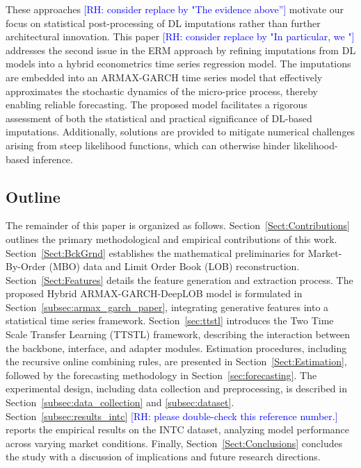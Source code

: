 \documentclass[10pt,a4paper,oneside]{article}
\newcommand{\rh}[1]{\textcolor{blue}{\textsf{[RH: #1]}}}
\begin{document}
These approaches \rh{consider replace by "The evidence above''} motivate our focus on statistical post-processing of DL imputations rather than further architectural innovation. This paper \rh{consider replace by "In particular, we "} addresses the second issue in the ERM approach by refining imputations from DL models into a hybrid econometrics time series regression model. The imputations are embedded into an ARMAX-GARCH time series model that effectively approximates the stochastic dynamics of the micro-price process, thereby enabling reliable forecasting. The proposed model facilitates a rigorous assessment of both the statistical and practical significance of DL-based imputations. Additionally, solutions are provided to mitigate numerical challenges arising from steep likelihood functions, which can otherwise hinder likelihood-based inference.

\subsection{Outline}
\label{subsec:outline}

The remainder of this paper is organized as follows. Section~\ref{Sect:Contributions} outlines the primary methodological and empirical contributions of this work. Section~\ref{Sect:BckGrnd} establishes the mathematical preliminaries for Market-By-Order (MBO) data and Limit Order Book (LOB) reconstruction. Section~\ref{Sect:Features} details the feature generation and extraction process. The proposed Hybrid ARMAX-GARCH-DeepLOB model is formulated in Section~\ref{subsec:armax_garch_paper}, integrating generative features into a statistical time series framework. Section~\ref{sec:ttstl} introduces the Two Time Scale Transfer Learning (TTSTL) framework, describing the interaction between the backbone, interface, and adapter modules. Estimation procedures, including the recursive online combining rules, are presented in Section~\ref{Sect:Estimation}, followed by the forecasting methodology in Section~\ref{sec:forecasting}. The experimental design, including data collection and preprocessing, is described in Section~\ref{subsec:data_collection} and \ref{subsec:dataset}. Section~\ref{subsec:results_intc} \rh{please double-check this reference number.} reports the empirical results on the INTC dataset, analyzing model performance across varying market conditions. Finally, Section~\ref{Sect:Conclusions} concludes the study with a discussion of implications and future research directions.

\end{document}
